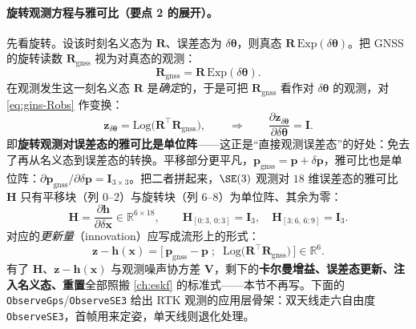 \paragraph{旋转观测方程与雅可比（要点 2 的展开）。}
先看旋转。设该时刻名义态为 $\mathbf{R}$、误差态为 $\delta\boldsymbol{\theta}$，则真态 $\mathbf{R}\,\mathrm{Exp}(\delta\boldsymbol{\theta})$。把 GNSS 的旋转读数 $\mathbf{R}_{\text{gnss}}$ 视为对真态的观测：
\begin{equation}
\label{eq:gins-Robs}
\mathbf{R}_{\text{gnss}} = \mathbf{R}\,\mathrm{Exp}(\delta\boldsymbol{\theta}).
\end{equation}
在观测发生这一刻名义态 $\mathbf{R}$ 是\emph{确定}的，于是可把 $\mathbf{R}_{\text{gnss}}$ 看作对 $\delta\boldsymbol{\theta}$ 的观测，对 \cref{eq:gins-Robs} 作变换：
\begin{equation}
\label{eq:gins-ztheta}
\mathbf{z}_{\delta\boldsymbol{\theta}} = \mathrm{Log}\big(\mathbf{R}^\top\mathbf{R}_{\text{gnss}}\big),
\qquad\Longrightarrow\qquad
\frac{\partial\mathbf{z}_{\delta\boldsymbol{\theta}}}{\partial\delta\boldsymbol{\theta}} = \mathbf{I}.
\end{equation}
即\textbf{旋转观测对误差态的雅可比是单位阵}——这正是“直接观测误差态”的好处：免去了再从名义态到误差态的转换。平移部分更平凡，$\mathbf{p}_{\text{gnss}}=\mathbf{p}+\delta\mathbf{p}$，雅可比也是单位阵：$\partial\mathbf{p}_{\text{gnss}}/\partial\delta\mathbf{p}=\mathbf{I}_{3\times3}$。把二者拼起来，$\SE(3)$ 观测对 $18$ 维误差态的雅可比 $\mathbf{H}$ 只有平移块（列 $0$–$2$）与旋转块（列 $6$–$8$）为单位阵、其余为零：
\begin{equation}
\label{eq:gins-H}
\mathbf{H}=\frac{\partial\mathbf{h}}{\partial\delta\mathbf{x}}\in\mathbb{R}^{6\times18},\qquad
\mathbf{H}_{[0:3,\,0:3]}=\mathbf{I}_3,\quad \mathbf{H}_{[3:6,\,6:9]}=\mathbf{I}_3.
\end{equation}
对应的\emph{更新量}（innovation）应写成流形上的形式\cite{gao2023slamad}：
\begin{equation}
\label{eq:gins-innov}
\mathbf{z}-\mathbf{h}(\mathbf{x}) =
\Big[\,\mathbf{p}_{\text{gnss}}-\mathbf{p}\;;\;\;\mathrm{Log}\big(\mathbf{R}^\top\mathbf{R}_{\text{gnss}}\big)\,\Big]\in\mathbb{R}^6.
\end{equation}
有了 $\mathbf{H}$、$\mathbf{z}-\mathbf{h}(\mathbf{x})$ 与观测噪声协方差 $\mathbf{V}$，剩下的\textbf{卡尔曼增益、误差态更新、注入名义态、重置}全部照搬 \cref{ch:eskf} 的标准式——本节不再写。下面的 \texttt{ObserveGps}/\allowbreak\texttt{ObserveSE3} 给出 RTK 观测的应用层骨架：双天线走六自由度 \texttt{ObserveSE3}，首帧用来定姿，单天线则退化处理。

